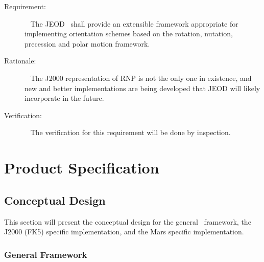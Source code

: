 \label{reqt:RNP_extension}
\begin{description}
\item[Requirement:]\ \newline
The JEOD \ModelDesc\ shall provide an extensible framework appropriate for implementing orientation
schemes based on the rotation, nutation, precession and polar motion framework.
\item[Rationale:]\ \newline
The J2000 representation of RNP is not the only one in existence, and new and better implementations
are being developed that JEOD will likely incorporate in the future.
\item[Verification:]\ \newline
The verification for this requirement will be done by inspection.

\end{description}
%
%
%
%
%

\chapter{Product Specification}\label{ch:spec}

\section{Conceptual Design}

This section will present the conceptual design for the general
\ModelDesc\ framework, the J2000 (FK5) specific implementation, and the Mars
specific implementation.

\subsection{General Framework}

